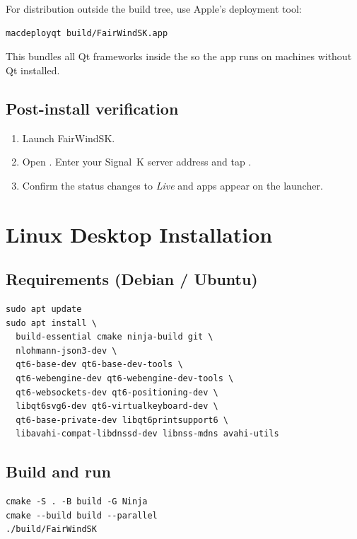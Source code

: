 For distribution outside the build tree, use Apple's deployment tool:

\begin{lstlisting}
macdeployqt build/FairWindSK.app
\end{lstlisting}

This bundles all Qt frameworks inside the  so the app runs
on machines without Qt installed.

\subsection{Post-install verification}

\begin{enumerate}
  \item Launch FairWindSK.
  \item Open .
        Enter your Signal~K server address and tap .
  \item Confirm the status changes to \textit{Live} and apps appear on the launcher.
\end{enumerate}

\section{Linux Desktop Installation}
\label{app:linux}

\subsection{Requirements (Debian / Ubuntu)}

\begin{lstlisting}
sudo apt update
sudo apt install \
  build-essential cmake ninja-build git \
  nlohmann-json3-dev \
  qt6-base-dev qt6-base-dev-tools \
  qt6-webengine-dev qt6-webengine-dev-tools \
  qt6-websockets-dev qt6-positioning-dev \
  libqt6svg6-dev qt6-virtualkeyboard-dev \
  qt6-base-private-dev libqt6printsupport6 \
  libavahi-compat-libdnssd-dev libnss-mdns avahi-utils
\end{lstlisting}

\subsection{Build and run}

\begin{lstlisting}
cmake -S . -B build -G Ninja
cmake --build build --parallel
./build/FairWindSK
\end{lstlisting}

